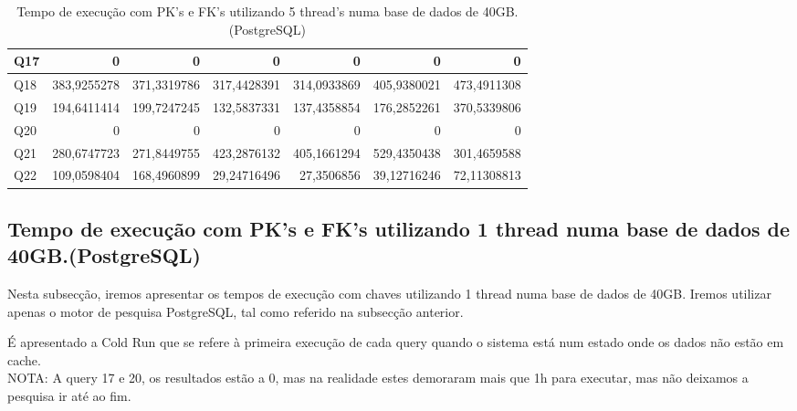 \documentclass{article}
\begin{document}
\begin{table}[H]
{\begin{tabular}{|l|r|r|r|r|r|r|}
        Q17&	0	&0	&0&	0	&0	&0\\ \hline
        Q18&	383,9255278	&371,3319786&	317,4428391&	314,0933869	&405,9380021&	473,4911308\\ \hline
        Q19&	194,6411414	&199,7247245&	132,5837331&	137,4358854	&176,2852261&	370,5339806\\ \hline
        Q20&	0	&0	&0&	0	&0	&0 \\ \hline
        Q21&	280,6747723	&271,8449755&	423,2876132	&405,1661294	&529,4350438	&301,4659588\\ \hline
        Q22&	109,0598404&	168,4960899&	29,24716496&	27,3506856	&39,12716246	&72,11308813\\ \hline
    \end{tabular}}
    \caption{Tempo de execução com PK's e FK's utilizando 5 thread's numa base de dados de 40GB.(PostgreSQL)}
    \label{tab:BC_Table6}
  \end{table}


\clearpage
  \subsection{Tempo de execução com PK's e FK's utilizando 1 thread numa base de dados de 40GB.(PostgreSQL)}
  \texttt{}\par Nesta subsecção, iremos apresentar os tempos de execução com chaves utilizando 1 thread numa base de dados de 40GB. Iremos utilizar apenas o motor de pesquisa PostgreSQL, tal como referido na subsecção anterior.\\ 
  \texttt{}\par É apresentado a Cold Run que se refere à primeira execução de cada query quando o sistema está num estado onde os dados não estão em cache.\\
  NOTA: A query 17 e 20, os resultados estão a 0, mas na realidade estes demoraram mais que 1h para executar, mas não deixamos a pesquisa ir até ao fim.
  
\end{document}
